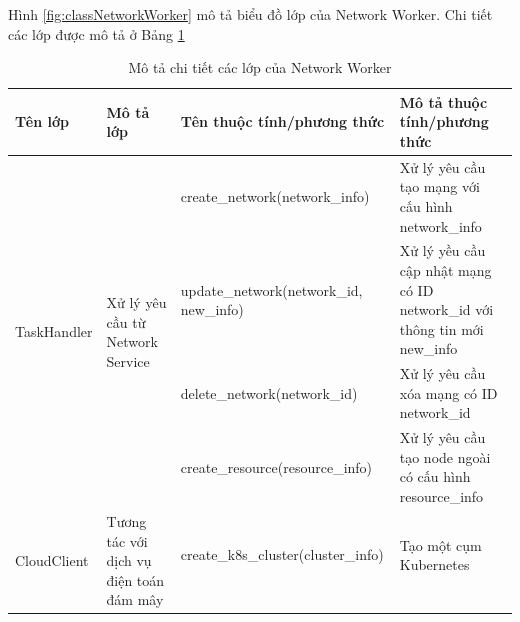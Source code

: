 \documentclass[../DoAn.tex]{subfiles}
\begin{document}
Hình \ref{fig:classNetworkWorker} mô tả biểu đồ lớp của Network Worker. Chi
tiết các lớp được mô tả ở Bảng \ref{tab:classNetworkWorker}

\begin{longtable}{|p{}|p{}|p{}|p{}|}
    \caption{Mô tả chi tiết các lớp của Network Worker}
    \label{tab:classNetworkWorker}                                                                                                                                                                                                                          \\
    \hline
    Tên lớp                                     & Mô tả lớp                                                               & Tên thuộc tính/phương thức                          & Mô tả thuộc tính/phương thức                                              \\ \hline
    \endhead
    \multirow[t]{4}{0.2\textwidth}{TaskHandler} & \multirow[t]{4}{0.2\textwidth}{Xử lý yêu cầu từ Network Service}        & create\_network\hspace{0pt}(network\_info)          & Xử lý yêu cầu tạo mạng với cấu hình network\_info                         \\ \hline
                                                &                                                                         & update\_network\hspace{0pt}(network\_id, new\_info) & Xử lý yều cầu cập nhật mạng có ID network\_id với thông tin mới new\_info \\ \cline{3-4}
                                                &                                                                         & delete\_network\hspace{0pt}(network\_id)            & Xử lý yêu cầu xóa mạng có ID network\_id                                  \\ \cline{3-4}
                                                &                                                                         & create\_resource\hspace{0pt}(resource\_info)        & Xử lý yêu cầu tạo node ngoài có cấu hình resource\_info                   \\ \hline
    \multirow[t]{2}{0.2\textwidth}{CloudClient} & \multirow[t]{2}{0.2\textwidth}{Tương tác với dịch vụ điện toán đám mây} & create\_k8s\_cluster\hspace{0pt}(cluster\_info)     & Tạo một cụm Kubernetes                                                    \\ \cline{3-4}

\end{longtable}
\end{document}
